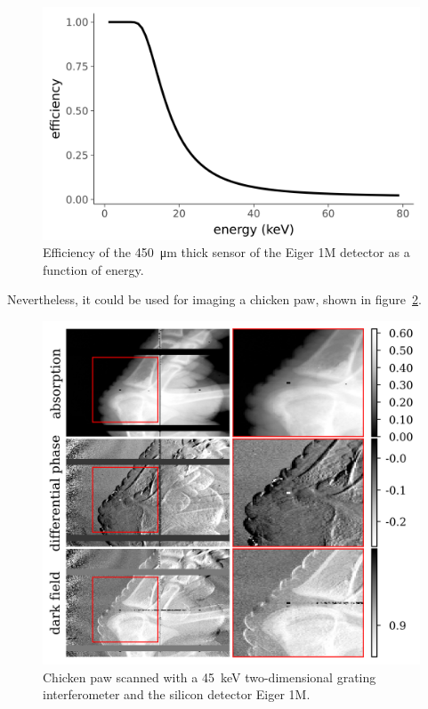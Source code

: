 \begin{figure}[htb]
    \centering
    \includegraphics[width=\textwidth]{gfx/eiger/efficiency.png}
    \caption[Efficiency of the Eiger silicon detector]{Efficiency of the \SI{450}{\micro\meter} thick sensor of the
Eiger 1M detector as a function of energy.}
    \label{fig:eiger-efficiency}
\end{figure}

Nevertheless, it could be used for imaging a chicken paw, shown in
figure~\ref{fig:eiger-chicken}.

\begin{figure}[htb]
    \centering
    \includegraphics[width=\textwidth]{gfx/eiger/series_160729_170729669658_series_160729_171501073073.png}
    \caption[Chicken paw radiography]{Chicken paw scanned with a \SI{45}{\kilo\eV} two-dimensional
grating interferometer and the silicon detector Eiger 1M.}
    \label{fig:eiger-chicken}
\end{figure}


